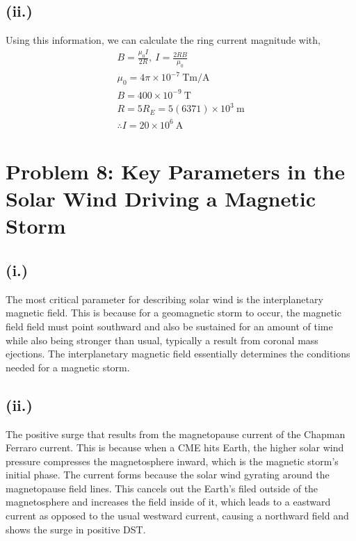 \documentclass[11pt]{article}
\begin{document}
\subsection*{(ii.)}
\hspace*{2em}Using this information, we can calculate the ring current magnitude with,
\begin{gather*}
B = \frac{\mu_0 I}{2R},~I = \frac{2RB}{\mu_0} \\
\mu_0 = 4\pi\times10^{-7}~\mathrm{Tm/A} \\
B = 400\times10^{-9}~\mathrm{T}\\
R = 5R_E = 5(6371)\times10^3~\mathrm{m}\\
\boxed{\therefore I = 20\times10^6~\mathrm{A}}
\end{gather*}

\newpage
\section*{Problem 8: Key Parameters in the Solar Wind Driving a Magnetic Storm}
\subsection*{(i.)}
\hspace*{2em}The most critical parameter for describing solar wind is the interplanetary magnetic field. This is because for a geomagnetic storm to occur, the magnetic field field must point southward and also be sustained for an amount of time while also being stronger than usual, typically a result from coronal mass ejections. The interplanetary magnetic field essentially determines the conditions needed for a magnetic storm. 
\subsection*{(ii.)}
\hspace*{2em}The positive surge that results from the magnetopause current of the Chapman Ferraro current. This is because when a CME hits Earth, the higher solar wind pressure compresses the magnetosphere inward, which is the magnetic storm's initial phase. The current forms because the solar wind gyrating around the magnetopause field lines. This cancels out the Earth's filed outside of the magnetosphere and increases the field inside of it, which leads to a eastward current as opposed to the usual westward current, causing a northward field and shows the surge in positive DST. 
\end{document}
